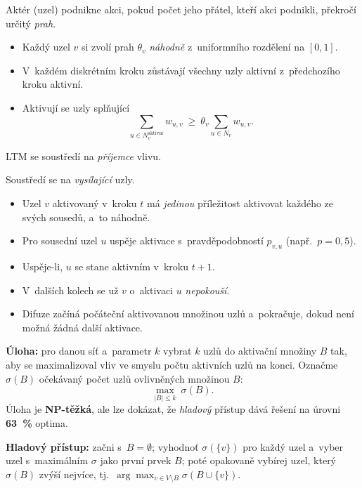 \documentclass[11pt,a4paper]{article}
\theoremstyle{definition}
\begin{document}
\begin{defbox}
Aktér (uzel) podnikne akci, pokud počet jeho přátel, kteří akci podnikli, překročí určitý
\emph{prah}.
\begin{itemize}
\item Každý uzel $v$ si zvolí prah $\theta_v$ \emph{náhodně} z~uniformního rozdělení na
      $[0,1]$.
\item V~každém diskrétním kroku zůstávají všechny uzly aktivní z~předchozího kroku aktivní.
\item Aktivují se uzly splňující
      \[ \sum_{u\in N_v^{\text{aktivní}}} w_{u,v}\ \ge\ \theta_v
         \sum_{u\in N_v} w_{u,v}. \]
\end{itemize}
LTM se soustředí na \emph{příjemce} vlivu.
\end{defbox}

\begin{defbox}
Soustředí se na \emph{vysílající} uzly.
\begin{itemize}
\item Uzel $v$ aktivovaný v~kroku $t$ má \emph{jedinou} příležitost aktivovat každého ze svých
      sousedů, a~to náhodně.
\item Pro sousední uzel $u$ uspěje aktivace s~pravděpodobností $p_{v,u}$ (např.\ $p=0{,}5$).
\item Uspěje-li, $u$ se stane aktivním v~kroku $t+1$.
\item V~dalších kolech se už $v$ o~aktivaci $u$ \emph{nepokouší}.
\item Difuze začíná počáteční aktivovanou množinou uzlů a~pokračuje, dokud není možná žádná
      další aktivace.
\end{itemize}
\end{defbox}

\begin{defbox}
\textbf{Úloha:} pro danou síť a~parametr $k$ vybrat $k$ uzlů do aktivační množiny $B$ tak, aby
se maximalizoval vliv ve smyslu počtu aktivních uzlů na konci. Označme $\sigma(B)$ očekávaný
počet uzlů ovlivněných množinou $B$:
\[ \max_{|B|\le k}\ \sigma(B). \]
Úloha je \textbf{NP-těžká}, ale lze dokázat, že \emph{hladový} přístup dává řešení na úrovni
\textbf{63~\%} optima.

\textbf{Hladový přístup:} začni s~$B=\emptyset$; vyhodnoť $\sigma(\{v\})$ pro každý uzel
a~vyber uzel s~maximálním $\sigma$ jako první prvek $B$; poté opakovaně vybírej uzel, který
$\sigma(B)$ zvýší nejvíce, tj.\ $\arg\max_{v\in V\setminus B}\sigma(B\cup\{v\})$.
\end{defbox}
\end{document}
